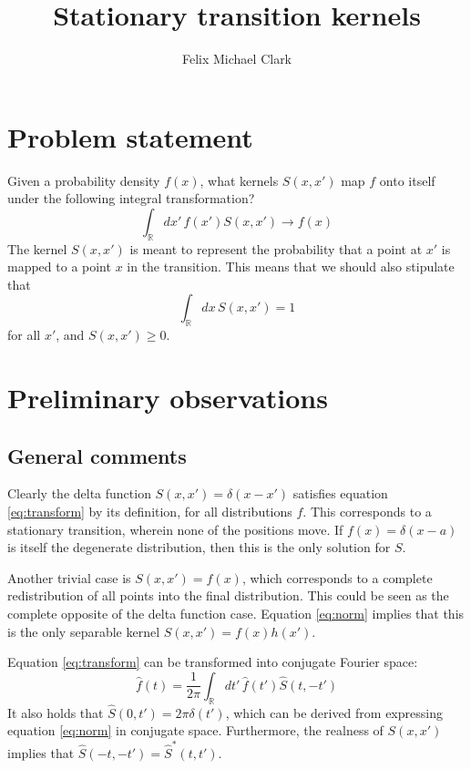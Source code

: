 \documentclass{article}
\title{Stationary transition kernels}
\author{Felix Michael Clark}
\newcommand{\intR}{\int_{\mathbb{R}}}
\begin{document}
\maketitle

\section{Problem statement}
Given a probability density $f(x)$, what kernels $S(x, x')$ map $f$ onto itself under the following integral transformation?
\begin{equation}
	\intR dx' \, f(x') S(x, x') \rightarrow f(x)
	\label{eq:transform}
\end{equation}
The kernel $S(x, x')$ is meant to represent the probability that a point at
$x'$ is mapped to a point $x$ in the transition. This means that we should also stipulate that
\begin{equation}
	\intR dx\,S(x, x') = 1
	\label{eq:norm}
\end{equation}
for all $x'$, and $S(x, x') \geq 0$.

\section{Preliminary observations}
\subsection{General comments}
Clearly the delta function $S(x,x') = \delta(x - x')$ satisfies equation
\ref{eq:transform} by its definition, for all distributions $f$. This
corresponds to a stationary transition, wherein none of the positions move.
If $f(x) = \delta(x-a)$ is itself the degenerate distribution, then this is the
only solution for $S$.

Another trivial case is $S(x, x') = f(x)$, which corresponds to a complete
redistribution of all points into the final distribution. This could be seen as
the complete opposite of the delta function case. Equation \ref{eq:norm}
implies that this is the only separable kernel $S(x, x') = f(x) h(x')$.

Equation \ref{eq:transform} can be transformed into conjugate Fourier space:
\begin{equation}
	\hat f(t) = \frac{1}{2\pi} \intR dt'\,\hat f(t') \hat S(t, -t')
\end{equation}
It also holds that $\hat S(0, t') = 2\pi\delta(t')$, which can be derived from
expressing equation \ref{eq:norm} in conjugate space. Furthermore, the realness
of $S(x, x')$ implies that $\hat S(-t, -t') = \hat S^*(t, t')$.
\end{document}
